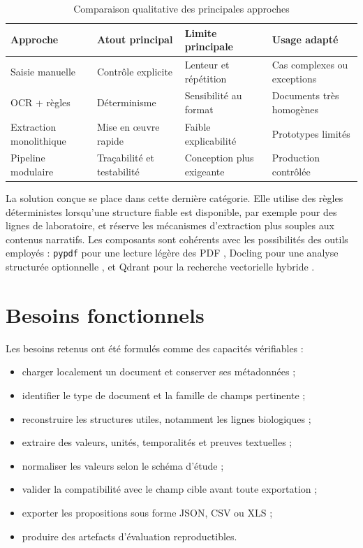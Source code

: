 \begin{table}[H]
\centering
\caption{Comparaison qualitative des principales approches}
\begin{tabularx}{\textwidth}{lXXX}
\toprule
Approche & Atout principal & Limite principale & Usage adapté\\
\midrule
Saisie manuelle & Contrôle explicite & Lenteur et répétition & Cas complexes ou exceptions\\
OCR + règles & Déterminisme & Sensibilité au format & Documents très homogènes\\
Extraction monolithique & Mise en œuvre rapide & Faible explicabilité & Prototypes limités\\
Pipeline modulaire & Traçabilité et testabilité & Conception plus exigeante & Production contrôlée\\
\bottomrule
\end{tabularx}
\end{table}

La solution conçue se place dans cette dernière catégorie. Elle utilise des règles déterministes lorsqu'une structure fiable est disponible, par exemple pour des lignes de laboratoire, et réserve les mécanismes d'extraction plus souples aux contenus narratifs. Les composants sont cohérents avec les possibilités des outils employés : \texttt{pypdf} pour une lecture légère des PDF \cite{pypdf}, Docling pour une analyse structurée optionnelle \cite{docling}, et Qdrant pour la recherche vectorielle hybride \cite{qdrant}.

\section{Besoins fonctionnels}
Les besoins retenus ont été formulés comme des capacités vérifiables :
\begin{itemize}
  \item charger localement un document et conserver ses métadonnées ;
  \item identifier le type de document et la famille de champs pertinente ;
  \item reconstruire les structures utiles, notamment les lignes biologiques ;
  \item extraire des valeurs, unités, temporalités et preuves textuelles ;
  \item normaliser les valeurs selon le schéma d'étude ;
  \item valider la compatibilité avec le champ cible avant toute exportation ;
  \item exporter les propositions sous forme JSON, CSV ou XLS ;
  \item produire des artefacts d'évaluation reproductibles.
\end{itemize}

